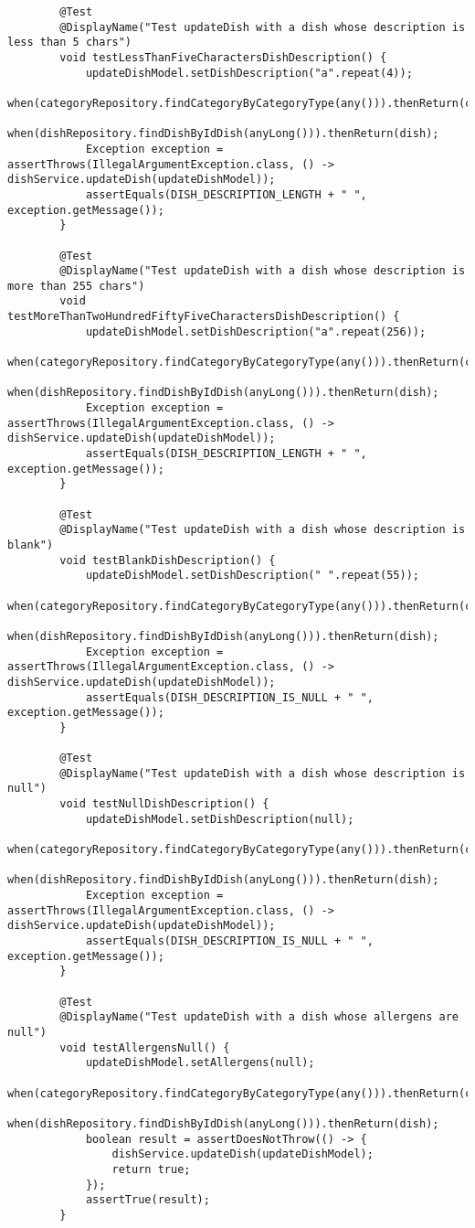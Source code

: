 \begin{verbatim}
		@Test
		@DisplayName("Test updateDish with a dish whose description is less than 5 chars")
		void testLessThanFiveCharactersDishDescription() {
			updateDishModel.setDishDescription("a".repeat(4));
			when(categoryRepository.findCategoryByCategoryType(any())).thenReturn(category);
			when(dishRepository.findDishByIdDish(anyLong())).thenReturn(dish);
			Exception exception = assertThrows(IllegalArgumentException.class, () -> dishService.updateDish(updateDishModel));
			assertEquals(DISH_DESCRIPTION_LENGTH + " ", exception.getMessage());
		}

		@Test
		@DisplayName("Test updateDish with a dish whose description is more than 255 chars")
		void testMoreThanTwoHundredFiftyFiveCharactersDishDescription() {
			updateDishModel.setDishDescription("a".repeat(256));
			when(categoryRepository.findCategoryByCategoryType(any())).thenReturn(category);
			when(dishRepository.findDishByIdDish(anyLong())).thenReturn(dish);
			Exception exception = assertThrows(IllegalArgumentException.class, () -> dishService.updateDish(updateDishModel));
			assertEquals(DISH_DESCRIPTION_LENGTH + " ", exception.getMessage());
		}

		@Test
		@DisplayName("Test updateDish with a dish whose description is blank")
		void testBlankDishDescription() {
			updateDishModel.setDishDescription(" ".repeat(55));
			when(categoryRepository.findCategoryByCategoryType(any())).thenReturn(category);
			when(dishRepository.findDishByIdDish(anyLong())).thenReturn(dish);
			Exception exception = assertThrows(IllegalArgumentException.class, () -> dishService.updateDish(updateDishModel));
			assertEquals(DISH_DESCRIPTION_IS_NULL + " ", exception.getMessage());
		}

		@Test
		@DisplayName("Test updateDish with a dish whose description is null")
		void testNullDishDescription() {
			updateDishModel.setDishDescription(null);
			when(categoryRepository.findCategoryByCategoryType(any())).thenReturn(category);
			when(dishRepository.findDishByIdDish(anyLong())).thenReturn(dish);
			Exception exception = assertThrows(IllegalArgumentException.class, () -> dishService.updateDish(updateDishModel));
			assertEquals(DISH_DESCRIPTION_IS_NULL + " ", exception.getMessage());
		}

		@Test
		@DisplayName("Test updateDish with a dish whose allergens are null")
		void testAllergensNull() {
			updateDishModel.setAllergens(null);
			when(categoryRepository.findCategoryByCategoryType(any())).thenReturn(category);
			when(dishRepository.findDishByIdDish(anyLong())).thenReturn(dish);
			boolean result = assertDoesNotThrow(() -> {
				dishService.updateDish(updateDishModel);
				return true;
			});
			assertTrue(result);
		}


\end{verbatim}
